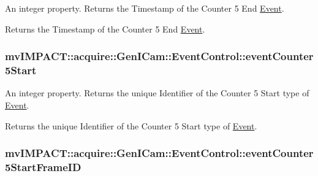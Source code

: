 An integer property. Returns the Timestamp of the Counter 5 End \hyperlink{classmv_i_m_p_a_c_t_1_1acquire_1_1_event}{Event}. 

Returns the Timestamp of the Counter 5 End \hyperlink{classmv_i_m_p_a_c_t_1_1acquire_1_1_event}{Event}. \hypertarget{classmv_i_m_p_a_c_t_1_1acquire_1_1_gen_i_cam_1_1_event_control_a1a70b8a2838c691f9720d4ed4e8c48b6}{
\subsubsection[{event\+Counter5\+Start}]{ mv\+I\+M\+P\+A\+C\+T\+::acquire\+::\+Gen\+I\+Cam\+::\+Event\+Control\+::event\+Counter5\+Start}}\label{classmv_i_m_p_a_c_t_1_1acquire_1_1_gen_i_cam_1_1_event_control_a1a70b8a2838c691f9720d4ed4e8c48b6}


An integer property. Returns the unique Identifier of the Counter 5 Start type of \hyperlink{classmv_i_m_p_a_c_t_1_1acquire_1_1_event}{Event}. 

Returns the unique Identifier of the Counter 5 Start type of \hyperlink{classmv_i_m_p_a_c_t_1_1acquire_1_1_event}{Event}. \hypertarget{classmv_i_m_p_a_c_t_1_1acquire_1_1_gen_i_cam_1_1_event_control_a224f3b265beab6a9c3476d204132b394}{
\subsubsection[{event\+Counter5\+Start\+Frame\+I\+D}]{ mv\+I\+M\+P\+A\+C\+T\+::acquire\+::\+Gen\+I\+Cam\+::\+Event\+Control\+::event\+Counter5\+Start\+Frame\+I\+D}}\label{classmv_i_m_p_a_c_t_1_1acquire_1_1_gen_i_cam_1_1_event_control_a224f3b265beab6a9c3476d204132b394}


